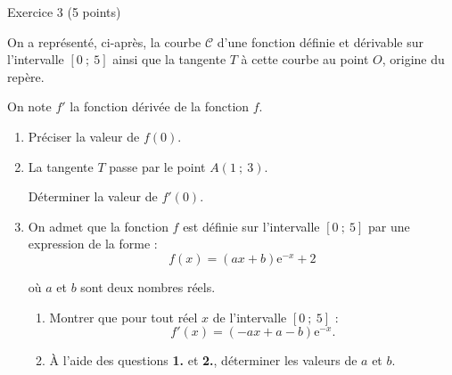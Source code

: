 
%
\begin{h2}Exercice 3 (5 points)\end{h2}
\par
On a représenté, ci-après, la courbe $\mathscr{C}$ d'une fonction définie et dérivable sur l'intervalle $[0~;~5]$ ainsi que la tangente $T$ à cette courbe au point $O$, origine du repère.
\par

\begin{center}
\end{center}
\par
On note $f'$ la fonction dérivée de la fonction $f$.
\par
%
%
\par
\begin{enumerate}
     \item
     Préciser la valeur de $f(0)$.
     \item
     La tangente $T$ passe par le point $A(1~;~3)$.
     \par
     Déterminer la valeur de $f'(0)$.
     \item
     On admet que la fonction $f$ est définie sur l'intervalle $[0~;~5]$ par une expression de la forme :
     \[ f(x)=(ax+b)\text{e}^{-x}+2 \]
     \par
     où $a$ et $b$ sont deux nombres réels.
     \par
     \begin{enumerate}
          \item
          Montrer que pour tout réel $x$ de l'intervalle $[0~;~5]$ :
          \[ f'(x)=(-ax+a-b)\text{e}^{-x}. \]
          \item
          \`A l'aide des questions \textbf{1.} et \textbf{2.}, déterminer les valeurs de $a$ et $b$.
          \par
     \end{enumerate}
     \par
\end{enumerate}
